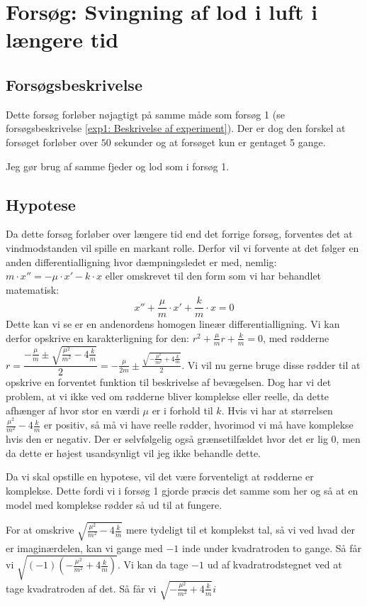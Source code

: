 \section{Forsøg: Svingning af lod i luft i længere tid}

\subsection{Forsøgsbeskrivelse}
Dette forsøg forløber nøjagtigt på samme måde som forsøg 1 (se forsøgsbeskrivelse \ref{exp1: Beskrivelse af experiment}).
Der er dog den forskel at forsøget forløber over $50$ sekunder og at forsøget kun er gentaget 5 gange. 

Jeg gør brug af samme fjeder og lod som i forsøg 1.

\subsection{Hypotese}\label{exp2: Hypotese}
Da dette forsøg forløber over længere tid end det forrige forsøg, forventes det at vindmodstanden vil spille en markant rolle. 
Derfor vil vi forvente at det følger en anden differentialligning hvor dæmpningsledet er med, nemlig:
$m\cdot x''= -\mu \cdot x' - k\cdot x$
eller omskrevet til den form som vi har behandlet matematisk:
$$x''+ \frac{\mu}{m} \cdot x' + \frac{k}{m}\cdot x=0$$
Dette kan vi  se er en andenordens homogen lineær differentialligning.
Vi kan derfor opskrive en karakterligning for den:
$r^2 + \frac{\mu}{m} r + \frac{k}{m} = 0$, med rødderne $r = \dfrac{-\frac{\mu}{m} \pm \sqrt{\frac{\mu^2}{m^2}-4\frac{k}{m}}}{2}=
-\frac{\mu}{2m}  \pm   \frac{\sqrt{-\frac{\mu^2}{m^2}+4\frac{k}{m}}}{2}$.
Vi vil nu gerne bruge disse rødder til at opskrive en forventet funktion til beskrivelse af bevægelsen. 
Dog har vi det problem, at vi ikke ved om rødderne bliver komplekse eller reelle, da dette afhænger af hvor stor en værdi $\mu$ er i forhold til $k$.
Hvis vi har at størrelsen $\frac{\mu^2}{m^2}-4\frac{k}{m}$ er positiv, så må vi have reelle rødder, hvorimod vi må have komplekse hvis den er negativ. 
Der er selvfølgelig også grænsetilfældet hvor det er lig $0$, men da dette er højest usandsynligt vil jeg ikke behandle dette. 

Da vi skal opstille en hypotese, vil det være forventeligt at rødderne er komplekse. 
Dette fordi vi i forsøg 1 gjorde præcis det samme som her og så at en model med komplekse rødder så ud til at fungere. 

For at omskrive $\sqrt{\frac{\mu^2}{m^2}-4\frac{k}{m}}$ mere tydeligt til et komplekst tal, så vi ved hvad der er imaginærdelen, kan vi gange med $-1$ inde under kvadratroden to gange. 
Så får vi $\sqrt{(-1)(-\frac{\mu^2}{m^2}+4\frac{k}{m})}$.
Vi kan da tage $-1$ ud af kvadratrodstegnet ved at tage kvadratroden af det. 
Så får vi $\sqrt{-\frac{\mu^2}{m^2}+4\frac{k}{m}}i$

